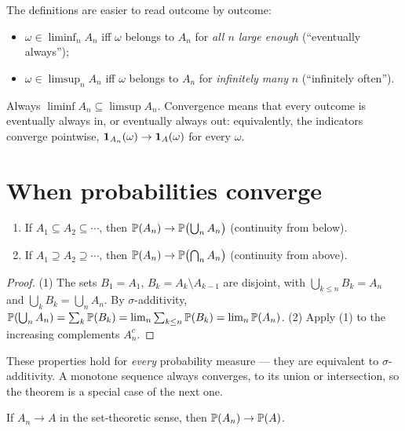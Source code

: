 \begin{notechapter}
The definitions are easier to read outcome by outcome:
\begin{itemize}
  \item $\omega\in\liminf_nA_n$ iff $\omega$ belongs to $A_n$ for \emph{all $n$
        large enough} (``eventually always'');
  \item $\omega\in\limsup_nA_n$ iff $\omega$ belongs to $A_n$ for \emph{infinitely
        many} $n$ (``infinitely often'').
\end{itemize}
Always $\liminf A_n\subseteq\limsup A_n$. Convergence means that every outcome
is eventually always in, or eventually always out: equivalently, the indicators
converge pointwise, $\mathbf{1}_{A_n}(\omega)\to\mathbf{1}_A(\omega)$ for every
$\omega$.

\section{When probabilities converge}\label{convergence-of-events:sec:probabilities}

\begin{theorem}\label{convergence-of-events:thm:monotone}
\begin{enumerate}[nosep]
  \item If $A_1\subseteq A_2\subseteq\cdots$, then $\mathbb{P}(A_n)\to\mathbb{P}\bigl(\bigcup_nA_n\bigr)$
        (continuity from below).
  \item If $A_1\supseteq A_2\supseteq\cdots$, then $\mathbb{P}(A_n)\to\mathbb{P}\bigl(\bigcap_nA_n\bigr)$
        (continuity from above).
\end{enumerate}
\end{theorem}

\begin{proof}
(1) The sets $B_1 = A_1$, $B_k = A_k\setminus A_{k-1}$ are disjoint, with
$\bigcup_{k\leq n}B_k = A_n$ and $\bigcup_kB_k = \bigcup_nA_n$. By
$\sigma$-additivity, $\mathbb{P}(\bigcup_nA_n) = \sum_k\mathbb{P}(B_k) = \lim_n\sum_{k\leq n}\mathbb{P}(B_k) = \lim_n\mathbb{P}(A_n)$.
(2) Apply (1) to the increasing complements $A_n^c$.
\end{proof}

These properties hold for \emph{every} probability measure --- they are
equivalent to $\sigma$-additivity. A monotone sequence always converges, to its
union or intersection, so the theorem is a special case of the next one.

\begin{theorem}\label{convergence-of-events:thm:convergent}
If $A_n\to A$ in the set-theoretic sense, then $\mathbb{P}(A_n)\to\mathbb{P}(A)$.
\end{theorem}


\end{notechapter}
